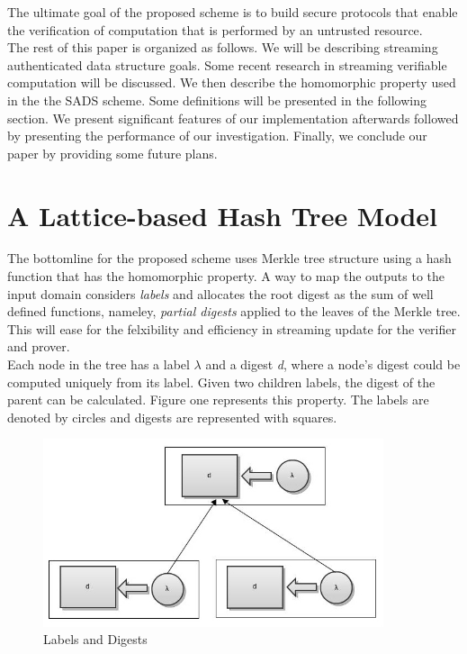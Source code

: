 \documentclass[11pt, letterpaper, oneside]{article}
\begin{document}
	The ultimate goal of the proposed scheme is to build secure protocols that enable the verification of computation
	that is performed by an untrusted resource.\\
		
	The rest of this paper is organized as follows. We will be describing streaming authenticated data structure 
	goals. Some recent research in streaming verifiable computation will be discussed. We then describe the 
	homomorphic property used in the the SADS scheme. Some definitions will be presented in the following section.
	We present significant features of our implementation afterwards followed by presenting the performance of 
	our investigation. Finally, we conclude our paper by providing some future plans.\\
	
	\section{A Lattice-based Hash Tree Model}
	
	The bottomline for the proposed scheme uses Merkle tree structure using a hash function that has the homomorphic
	property. A way to map the outputs to the input domain considers \textit{labels} and allocates the root digest as
	the sum of well defined functions, nameley, \textit{partial digests} applied to the leaves of the Merkle tree.
	This will ease for the felxibility and efficiency in streaming update for the verifier and prover. \\
	
	Each node in the tree has a label $\lambda$ and a digest \textit{d}, where a node's digest
	could be computed uniquely from its label. Given two children labels, the digest of the parent can be 
	calculated. Figure one represents this property. The labels are denoted by circles and digests are 
	represented with squares. \\
	
        \begin{figure}[h]
        \centering
        \includegraphics[width=100mm]{./pic/label_digest.jpg}
        \caption[]{Labels and Digests}
        \end{figure}
\end{document}
